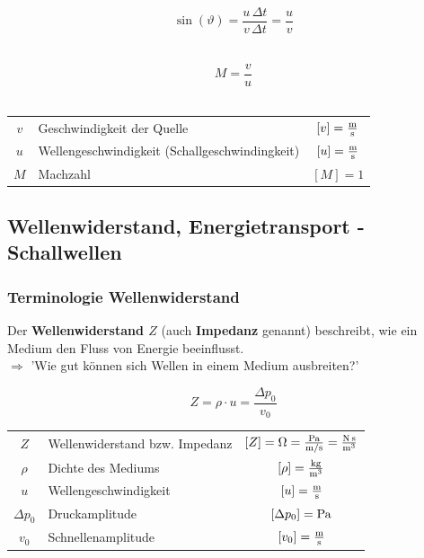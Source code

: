 \begin{minipage}{0.48\linewidth}
$$ \boxed{ \sin(\vartheta) = \frac{u \, \Delta t}{v \, \Delta t} = \frac{u}{v} } $$ \\
\end{minipage}
\hfill
\begin{minipage}{0.48\linewidth}
$$ \boxed{ M = \frac{v}{u} } $$ \\
\end{minipage}


\renewcommand{\arraystretch}{1.1}
\begin{tabular}{clc}
$v$ & Geschwindigkeit der Quelle & $[v] = \frac{\mathrm{m}}{\mathrm{s}}$ \\
$u$ & Wellengeschwindigkeit (Schallgeschwindingkeit) & $[u] = \frac{\mathrm{m}}{\mathrm{s}}$ \\
$M$ & Machzahl & $[M] = 1$
\end{tabular}
\renewcommand{\arraystretch}{1}



\subsection{Wellenwiderstand, Energietransport - Schallwellen}

\subsubsection{Terminologie Wellenwiderstand}
Der \textbf{Wellenwiderstand $Z$} (auch \textbf{Impedanz} genannt) beschreibt, wie ein Medium den Fluss
von Energie beeinflusst. \\
\vspace{0.3cm}
$\Rightarrow$ 'Wie gut können sich Wellen in einem Medium ausbreiten?'

$$ \boxed{ Z = \rho \cdot u = \frac{\Delta p_0}{v_0} } $$

\vspace{0.2cm}

\renewcommand{\arraystretch}{1.2}
\begin{tabular}{clc}
$Z$ & Wellenwiderstand bzw. Impedanz & $[Z] = \mathrm{\Omega} = \frac{\mathrm{Pa}}{\mathrm{m} / \mathrm{s}} = \frac{\mathrm{N} \, \mathrm{s}}{\mathrm{m}^3}$ \\
$\rho$ & Dichte des Mediums & $[\rho] = \frac{\mathrm{kg}}{\mathrm{m}^3}$ \\
$u$ & Wellengeschwindigkeit & $[u] = \frac{\mathrm{m}}{\mathrm{s}}$ \\
$\Delta p_0$ & Druckamplitude & $[\Delta p_0] = \mathrm{Pa}$ \\
$v_0$ & Schnellenamplitude & $[v_0] = \frac{\mathrm{m}}{\mathrm{s}}$
\end{tabular}
\renewcommand{\arraystretch}{1}




